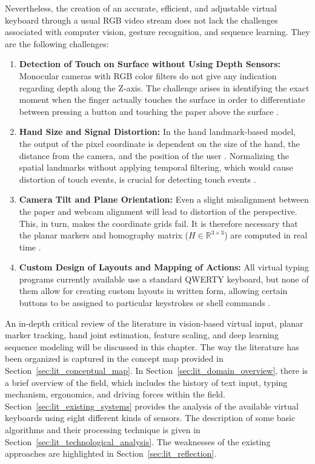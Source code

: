 Nevertheless, the creation of an accurate, efficient, and adjustable virtual keyboard through a usual RGB video stream does not lack the challenges associated with computer vision, gesture recognition, and sequence learning. They are the following challenges:
\begin{enumerate}
    \item \textbf{Detection of Touch on Surface without Using Depth Sensors:} Monocular cameras with RGB color filters do not give any indication regarding depth along the Z-axis. The challenge arises in identifying the exact moment when the finger actually touches the surface in order to differentiate between pressing a button and touching the paper above the surface \cite{Thomas2013Camera, Posner2012Single, Lee2019Virtual, Toshpulatov2024RealTime}.
    \item \textbf{Hand Size and Signal Distortion:} In the hand landmark-based model, the output of the pixel coordinate is dependent on the size of the hand, the distance from the camera, and the position of the user \cite{Zhang2020MediaPipe, Doan2022Efficient}. Normalizing the spatial landmarks without applying temporal filtering, which would cause distortion of touch events, is crucial for detecting touch events \cite{Kumar2026Hybrid}.
    \item \textbf{Camera Tilt and Plane Orientation:} Even a slight misalignment between the paper and webcam alignment will lead to distortion of the perspective. This, in turn, makes the coordinate grids fail. It is therefore necessary that the planar markers and homography matrix ($H \in \mathbb{R}^{3 \times 3}$) are computed in real time \cite{Wang2016AprilTag2, Kallwies2020Determining, Pirchheim2011Homography, Herdiansyah2024Implementation}.
    \item \textbf{Custom Design of Layouts and Mapping of Actions:} All virtual typing programs currently available use a standard QWERTY keyboard, but none of them allow for creating custom layouts in written form, allowing certain buttons to be assigned to particular keystrokes or shell commands \cite{ReviewVirtualKeyboard2020}.
\end{enumerate}

An in-depth critical review of the literature in vision-based virtual input, planar marker tracking, hand joint estimation, feature scaling, and deep learning sequence modeling will be discussed in this chapter. The way the literature has been organized is captured in the concept map provided in Section~\ref{sec:lit_conceptual_map}. In Section~\ref{sec:lit_domain_overview}, there is a brief overview of the field, which includes the history of text input, typing mechanism, ergonomics, and driving forces within the field. Section~\ref{sec:lit_existing_systems} provides the analysis of the available virtual keyboards using eight different kinds of sensors. The description of some basic algorithms and their processing technique is given in Section~\ref{sec:lit_technological_analysis}. The weaknesses of the existing approaches are highlighted in Section~\ref{sec:lit_reflection}.

